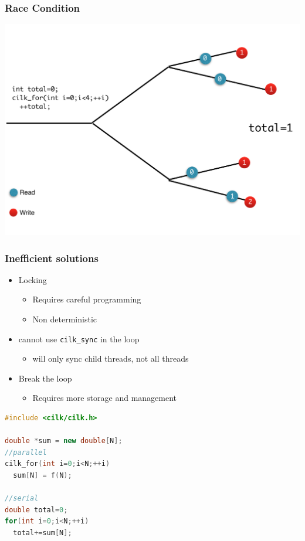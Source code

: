 \documentclass[fleqn,xcolor=table,10pt,final]{beamer}
\begin{document}
\begin{frame}
  \frametitle{Race Condition}
  \includegraphics[width=\textwidth]{figures/race}
\end{frame}

\begin{frame}[fragile]
  \frametitle{Inefficient solutions}
  \begin{itemize}
    \itemsep 0.4cm
    \item Locking
      \begin{itemize}
        \item Requires careful programming
        \item Non deterministic
      \end{itemize}
    \item cannot use {\tt cilk\_sync} in the loop
      \begin{itemize}
        \item will only sync child threads, not all threads
      \end{itemize}
    \item Break the loop
      \begin{itemize}
        \item Requires more storage and management
      \end{itemize}
  \end{itemize}
  \begin{lstlisting}[language=C++,basicstyle=\scriptsize]
#include <cilk/cilk.h>

double *sum = new double[N];
//parallel
cilk_for(int i=0;i<N;++i)
  sum[N] = f(N);

//serial
double total=0;
for(int i=0;i<N;++i)
  total+=sum[N];
  \end{lstlisting}
\end{frame}
\end{document}
